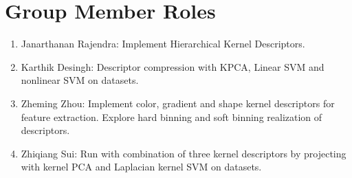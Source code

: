 \documentclass[10pt,twocolumn,letterpaper]{article}
\begin{document}
\section{Group Member Roles}
\begin{enumerate}
\item Janarthanan Rajendra: Implement Hierarchical Kernel Descriptors.
\item Karthik Desingh: Descriptor compression with KPCA, Linear SVM and nonlinear SVM on datasets.
\item Zheming Zhou: Implement color, gradient and shape kernel descriptors for feature extraction. Explore hard binning and soft binning realization of descriptors.
\item Zhiqiang Sui: Run with combination of three kernel descriptors by projecting with kernel PCA and Laplacian kernel SVM on datasets.
\end{enumerate}
{\small


}

 
\end{document}
